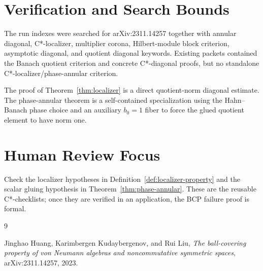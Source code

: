 \documentclass[11pt]{article}
\begin{document}
\section*{Verification and Search Bounds}

The run indexes were searched for arXiv:2311.14257 together with annular
diagonal, C*-localizer, multiplier corona, Hilbert-module block criterion,
asymptotic diagonal, and quotient diagonal keywords.  Existing packets
contained the Banach quotient criterion and concrete C*-diagonal proofs, but
no standalone C*-localizer/phase-annular criterion.

The proof of Theorem~\ref{thm:localizer} is a direct quotient-norm diagonal
estimate.  The phase-annular theorem is a self-contained specialization using
the Hahn--Banach phase choice and an auxiliary \(b_0=1\) fiber to force the
glued quotient element to have norm one.

\section*{Human Review Focus}

Check the localizer hypotheses in Definition~\ref{def:localizer-property} and
the scalar gluing hypothesis in Theorem~\ref{thm:phase-annular}.  These are
the reusable C*-checklists; once they are verified in an application, the BCP
failure proof is formal.

\begin{thebibliography}{9}

Jinghao Huang, Karimbergen Kudaybergenov, and Rui Liu,
\emph{The ball-covering property of von Neumann algebras and noncommutative
symmetric spaces},
arXiv:2311.14257, 2023.

\end{thebibliography}
\end{document}
